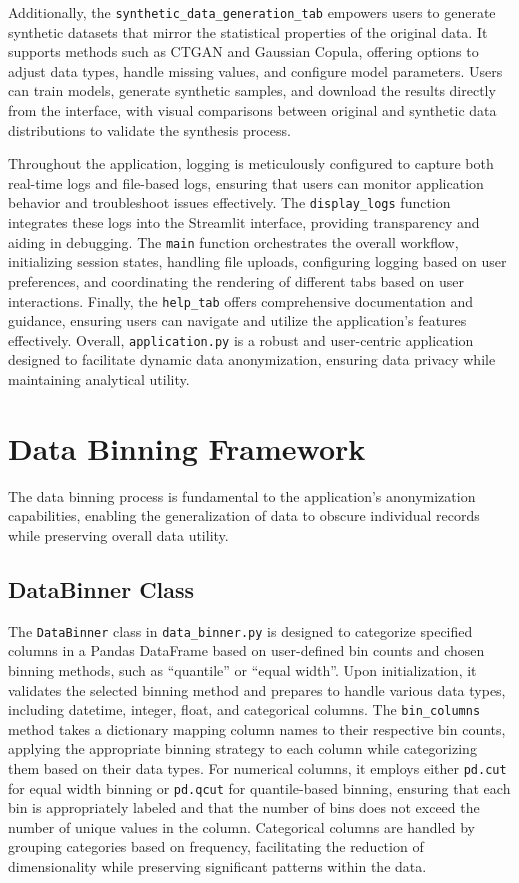 \documentclass{article}
\begin{document}
Additionally, the \texttt{synthetic\_data\_generation\_tab} empowers users to generate synthetic datasets that mirror the statistical properties of the original data. It supports methods such as CTGAN and Gaussian Copula, offering options to adjust data types, handle missing values, and configure model parameters. Users can train models, generate synthetic samples, and download the results directly from the interface, with visual comparisons between original and synthetic data distributions to validate the synthesis process.

Throughout the application, logging is meticulously configured to capture both real-time logs and file-based logs, ensuring that users can monitor application behavior and troubleshoot issues effectively. The \texttt{display\_logs} function integrates these logs into the Streamlit interface, providing transparency and aiding in debugging. The \texttt{main} function orchestrates the overall workflow, initializing session states, handling file uploads, configuring logging based on user preferences, and coordinating the rendering of different tabs based on user interactions. Finally, the \texttt{help\_tab} offers comprehensive documentation and guidance, ensuring users can navigate and utilize the application's features effectively. Overall, \texttt{application.py} is a robust and user-centric application designed to facilitate dynamic data anonymization, ensuring data privacy while maintaining analytical utility.

\section*{Data Binning Framework}
The data binning process is fundamental to the application's anonymization capabilities, enabling the generalization of data to obscure individual records while preserving overall data utility.

\subsection*{DataBinner Class}
The \texttt{DataBinner} class in \texttt{data\_binner.py} is designed to categorize specified columns in a Pandas DataFrame based on user-defined bin counts and chosen binning methods, such as ``quantile'' or ``equal width''. Upon initialization, it validates the selected binning method and prepares to handle various data types, including datetime, integer, float, and categorical columns. The \texttt{bin\_columns} method takes a dictionary mapping column names to their respective bin counts, applying the appropriate binning strategy to each column while categorizing them based on their data types. For numerical columns, it employs either \texttt{pd.cut} for equal width binning or \texttt{pd.qcut} for quantile-based binning, ensuring that each bin is appropriately labeled and that the number of bins does not exceed the number of unique values in the column. Categorical columns are handled by grouping categories based on frequency, facilitating the reduction of dimensionality while preserving significant patterns within the data.
\end{document}
